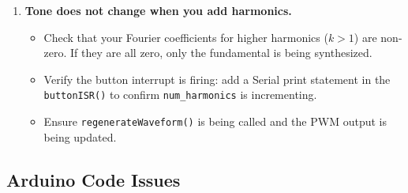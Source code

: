 \documentclass[11pt,letterpaper]{article}
\begin{document}
\begin{enumerate}
    \item \textbf{Tone does not change when you add harmonics.}
    \begin{itemize}
        \item Check that your Fourier coefficients for higher harmonics ($k > 1$) are non-zero. If they are all zero, only the fundamental is being synthesized.
        \item Verify the button interrupt is firing: add a Serial print statement in the \texttt{buttonISR()} to confirm \texttt{num\_harmonics} is incrementing.
        \item Ensure \texttt{regenerateWaveform()} is being called and the PWM output is being updated.
    \end{itemize}
\end{enumerate}

\subsection*{Arduino Code Issues}
\end{document}
